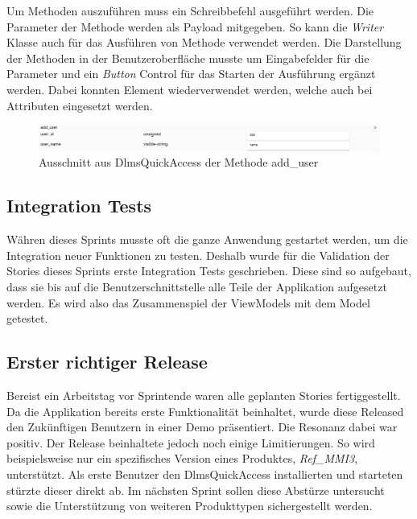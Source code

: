 Um Methoden auszuführen muss ein Schreibbefehl ausgeführt werden.
Die Parameter der Methode werden als Payload mitgegeben.
So kann die \textit{Writer} Klasse auch für das Ausführen von Methode verwendet werden.
Die Darstellung der Methoden in der Benutzeroberfläche musste um Eingabefelder für die Parameter und ein \textit{Button} Control für das Starten der Ausführung ergänzt werden.
Dabei konnten Element wiederverwendet werden, welche auch bei Attributen eingesetzt werden.
\begin{figure}
   \centering
   \includegraphics[width=1.0\textwidth]{gfx/addUserMethod.png}
   \caption{
      Ausschnitt aus DlmsQuickAccess der Methode add\_user
      }
      \label{fig:addUserMethod}
   \end{figure}



\subsection{Integration Tests}
Währen dieses Sprints musste oft die ganze Anwendung gestartet werden, um die Integration neuer Funktionen zu testen.
Deshalb wurde für die Validation der Stories dieses Sprints erste Integration Tests geschrieben.
Diese sind so aufgebaut, dass sie bis auf die Benutzerschnittstelle alle Teile der Applikation aufgesetzt werden.
Es wird also das Zusammenspiel der ViewModels mit dem Model getestet.

\subsection{Erster richtiger Release}\label{firstRelease}
Bereist ein Arbeitstag vor Sprintende waren alle geplanten Stories fertiggestellt.
Da die Applikation bereits erste Funktionalität beinhaltet, wurde diese Released den Zukünftigen Benutzern in einer Demo präsentiert.
Die Resonanz dabei war positiv.
Der Release beinhaltete jedoch noch einige Limitierungen.
So wird beispielsweise nur ein spezifisches Version eines Produktes, \textit{Ref\_MMI3}, unterstützt.
Als erste Benutzer den DlmsQuickAccess installierten und starteten stürzte dieser direkt ab.
Im nächsten Sprint sollen diese Abstürze untersucht sowie die Unterstützung von weiteren Produkttypen sichergestellt werden.
